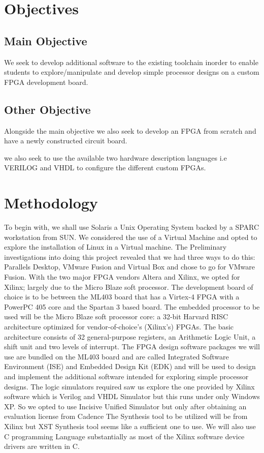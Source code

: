 \documentclass{article}
\begin{document}
\begin{flushleft}
\section{Objectives}

\subsection{Main Objective}
We seek to develop additional software to the existing toolchain inorder  to enable students to explore/manipulate and develop simple processor designs on a custom FPGA development board.
\subsection{Other Objective}
Alongside the main objective we also seek to develop an FPGA from scratch and have a newly constructed circuit board.

we also seek to use the available two hardware description languages i.e VERILOG and VHDL to configure the different custom FPGAs.

\section{Methodology}
To begin with, we shall use Solaris a Unix Operating System backed by a SPARC workstation from SUN.
We considered the use of a Virtual Machine and opted to explore the installation of Linux in a Virtual machine. 
\newline
The Preliminary investigations into doing this project revealed that we had three ways to do this: Parallels Desktop, VMware Fusion and Virtual Box and chose to go for VMware Fusion.
With the two major FPGA vendors Altera and Xilinx, we opted for Xilinx; largely due to the Micro Blaze soft processor.
\newline
The development board of choice is to be between the ML403 board that has a Virtex-4 FPGA with a PowerPC 405 core and the Spartan 3 based board.
The embedded processor to be used will be the Micro Blaze soft processor core: a 32-bit Harvard RISC architecture optimized for vendor-of-choice’s (Xilinx’s) FPGAs. The basic architecture consists of 32 general-purpose registers, an Arithmetic Logic Unit, a shift unit and two levels of interrupt.
\newline
The FPGA design software packages we will use are bundled on the ML403 board and are called Integrated Software Environment (ISE) and Embedded Design Kit (EDK) and will be used to design and implement the additional software intended for exploring simple processor designs.
\newline
The logic simulators required saw us explore the one provided by Xilinx software which is Verilog and VHDL Simulator but this runs under only Windows XP. So we opted to use Incisive Unified Simulator but only after obtaining an evaluation license from Cadence 
The Synthesis tool to be utilized will be from Xilinx but XST Synthesis tool seems like a sufficient one to use.
We will also use C programming Language substantially as most of the Xilinx software device drivers are written in C.   


\end{flushleft}
\end{document}
